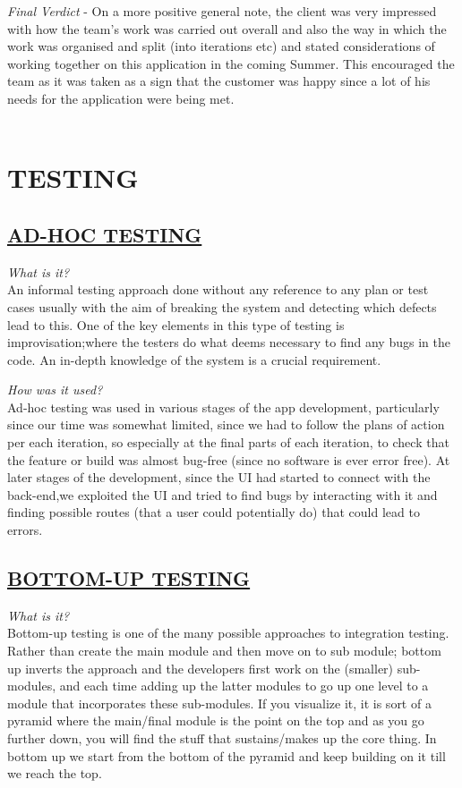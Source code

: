 \documentclass[paper=a4,fontsize=11pt]{article}
\newcommand{\sepspace}{\vspace*{1em}}		%
\newcommand{\sephalfspace}{\vspace*{0.3em}}		%
\newcommand{\MainSection}[1]{\section*{\uppercase{#1}}}
\newcommand{\SectionPart}[1]{\subsection*{\uppercase{#1}}}
\begin{document}
\noindent
\textit{Final Verdict} -
On a more positive general note, the client was very impressed with how the team's work was
carried out overall and also the way in which the work was organised and split (into iterations
etc) and stated considerations of working together on this application in the coming Summer.
This encouraged the team as it was taken as a sign that the customer was happy since a lot of
his needs for the application were being met.\\\\

\newpage


\MainSection{Testing}

\SectionPart{\ul{Ad-hoc Testing}}
\textit{What is it?}\\
An informal testing approach done without any reference to any plan or test
cases usually with the aim of breaking the system and detecting which defects
lead to this. One of the key elements in this type of testing is improvisation;where the
testers do what deems necessary to find any bugs in the code. An in-depth knowledge of the
system is a crucial requirement.\\
\sephalfspace

\noindent
\textit{How was it used?}\\
Ad-hoc testing was used in various stages of the app development, particularly since our
time was somewhat limited, since we had to follow the plans of action per each iteration,
so especially at the final parts of each iteration, to check that the feature or build was almost
bug-free (since no software is ever error free). At later stages of the development, since the UI had
started to connect with the back-end,we exploited the UI and tried to find bugs by interacting with
it and finding possible routes (that a user could potentially do) that could lead to errors.\\
\sepspace

\SectionPart{\ul{Bottom-up Testing}}
\textit{What is it?}\\
Bottom-up testing is one of the many possible approaches to integration testing. Rather than
create the main module and then move on to sub module; bottom up inverts the approach and the developers
first work on the (smaller) sub-modules, and each time adding up the latter modules to go up one level to a
module that incorporates these sub-modules. If you visualize it, it is sort of a pyramid where the main/final
module is the point on the top and as you go further down, you will find the stuff that sustains/makes up the
core thing. In bottom up we start from the bottom of the pyramid and keep building on it till we reach the top.\\
\sephalfspace
\end{document}
